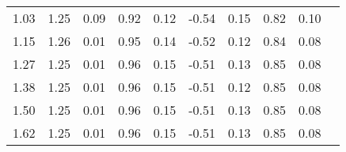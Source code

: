 \begin{tabular}{rrrrrrrrrr}
 1.03 &     1.25 &     0.09  &     0.92 &      0.12 &     -0.54 &      0.15 &      0.82 &      0.10 \\ 
 1.15 &     1.26 &     0.01  &     0.95 &      0.14 &     -0.52 &      0.12 &      0.84 &      0.08 \\ 
 1.27 &     1.25 &     0.01  &     0.96 &      0.15 &     -0.51 &      0.13 &      0.85 &      0.08 \\ 
 1.38 &     1.25 &     0.01  &     0.96 &      0.15 &     -0.51 &      0.12 &      0.85 &      0.08 \\ 
 1.50 &     1.25 &     0.01  &     0.96 &      0.15 &     -0.51 &      0.13 &      0.85 &      0.08 \\ 
 1.62 &     1.25 &     0.01  &     0.96 &      0.15 &     -0.51 &      0.13 &      0.85 &      0.08 \\ \hline 
\end{tabular}
